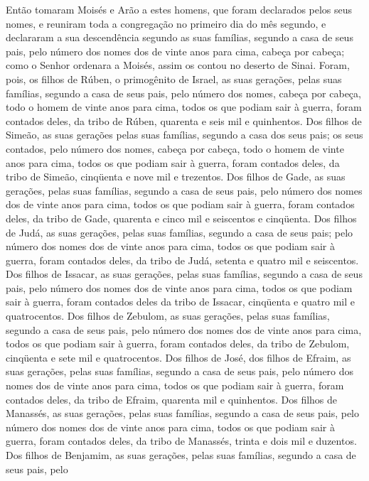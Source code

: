 Então tomaram Moisés e Arão a estes homens, que foram declarados
pelos seus nomes, e reuniram toda a congregação no primeiro
dia do mês segundo, e declararam a sua descendência segundo as suas
famílias, segundo a casa de seus pais, pelo número dos nomes dos de
vinte anos para cima, cabeça por cabeça; como o Senhor
ordenara a Moisés, assim os contou no deserto de Sinai.
Foram, pois, os filhos de Rúben, o primogênito de Israel, as
suas gerações, pelas suas famílias, segundo a casa de seus pais,
pelo número dos nomes, cabeça por cabeça, todo o homem de vinte anos
para cima, todos os que podiam sair à guerra, foram contados
deles, da tribo de Rúben, quarenta e seis mil e quinhentos.
Dos filhos de Simeão, as suas gerações pelas suas famílias,
segundo a casa dos seus pais; os seus contados, pelo número dos
nomes, cabeça por cabeça, todo o homem de vinte anos para cima,
todos os que podiam sair à guerra, foram contados deles, da
tribo de Simeão, cinqüenta e nove mil e trezentos. Dos filhos
de Gade, as suas gerações, pelas suas famílias, segundo a casa de
seus pais, pelo número dos nomes dos de vinte anos para cima, todos
os que podiam sair à guerra, foram contados deles, da tribo
de Gade, quarenta e cinco mil e seiscentos e cinqüenta. Dos
filhos de Judá, as suas gerações, pelas suas famílias, segundo a
casa de seus pais; pelo número dos nomes dos de vinte anos para
cima, todos os que podiam sair à guerra, foram contados
deles, da tribo de Judá, setenta e quatro mil e seiscentos.
Dos filhos de Issacar, as suas gerações, pelas suas famílias,
segundo a casa de seus pais, pelo número dos nomes dos de vinte anos
para cima, todos os que podiam sair à guerra, foram contados
deles da tribo de Issacar, cinqüenta e quatro mil e quatrocentos.
Dos filhos de Zebulom, as suas gerações, pelas suas famílias,
segundo a casa de seus pais, pelo número dos nomes dos de vinte anos
para cima, todos os que podiam sair à guerra, foram contados
deles, da tribo de Zebulom, cinqüenta e sete mil e quatrocentos.
Dos filhos de José, dos filhos de Efraim, as suas gerações,
pelas suas famílias, segundo a casa de seus pais, pelo número dos
nomes dos de vinte anos para cima, todos os que podiam sair à
guerra, foram contados deles, da tribo de Efraim, quarenta
mil e quinhentos. Dos filhos de Manassés, as suas gerações,
pelas suas famílias, segundo a casa de seus pais, pelo número dos
nomes dos de vinte anos para cima, todos os que podiam sair à
guerra, foram contados deles, da tribo de Manassés, trinta e
dois mil e duzentos. Dos filhos de Benjamim, as suas
gerações, pelas suas famílias, segundo a casa de seus pais, pelo
